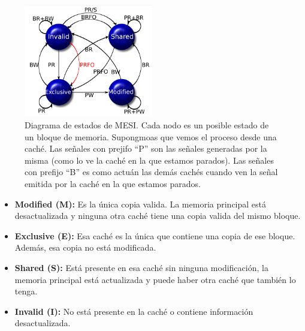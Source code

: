 \begin{figure}[ht]
	\centering
	\includegraphics[width=0.5\textwidth]{imagenes/mesi-state-graph}
	\caption{Diagrama de estados de MESI. Cada nodo es un posible estado de un bloque de memoria. Supongmoas que vemos el proceso desde una caché. Las señales con prejifo ``P'' son las señales generadas por la misma (como lo ve la caché en la que estamos parados). Las señales con prefijo ``B'' es como actuán las demás cachés cuando ven la señal emitida por la caché en la que estamos parados. }
	\label{fig:mesiDiagram}
\end{figure}

\begin{itemize}
	\item \textbf{Modified (M):} Es la única copia valida. La memoria principal está desactualizada y ninguna otra caché tiene una copia valida del mismo bloque.
	\item \textbf{Exclusive (E):} Esa caché es la única que contiene una copia de ese bloque. Además, esa copia no está modificada.
	\item \textbf{Shared (S):} Está presente en esa caché sin ninguna modificación, la memoria principal está actualizada y puede haber otra caché que también lo tenga.
	\item \textbf{Invalid (I):} No está presente en la caché o contiene información desactualizada.
\end{itemize}

